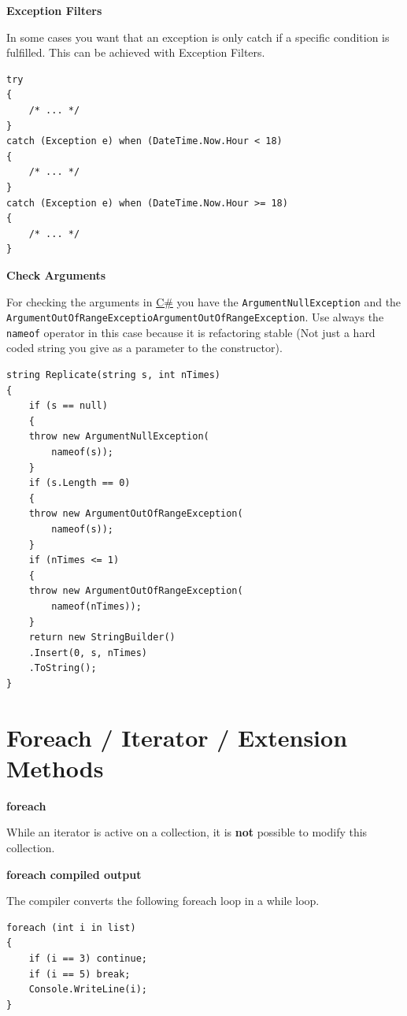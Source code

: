 \documentclass[11pt,twoside,landscape]{article}
\begin{document}
\begin{multicols}{3}
\textbf{Exception Filters}

In some cases you want that an exception is only catch if a specific condition is fulfilled.
This can be achieved with Exception Filters.

\lstset{language=csharp,label= ,caption= ,captionpos=b,numbers=none}
\begin{lstlisting}
try
{
    /* ... */
}
catch (Exception e) when (DateTime.Now.Hour < 18)
{
    /* ... */
}
catch (Exception e) when (DateTime.Now.Hour >= 18)
{
    /* ... */
}
\end{lstlisting}

\textbf{Check Arguments}

For checking the arguments in \href{../../../roam/20211003114158-c.org}{C\#} you have the \texttt{ArgumentNullException} and the \texttt{ArgumentOutOfRangeExceptioArgumentOutOfRangeException}.
Use always the \texttt{nameof} operator in this case because it is refactoring stable (Not just a hard coded string you give as a parameter to the constructor).

\lstset{language=csharp,label= ,caption= ,captionpos=b,numbers=none}
\begin{lstlisting}
string Replicate(string s, int nTimes)
{
    if (s == null)
    {
	throw new ArgumentNullException(
	    nameof(s));
    }
    if (s.Length == 0)
    {
	throw new ArgumentOutOfRangeException(
	    nameof(s));
    }
    if (nTimes <= 1)
    {
	throw new ArgumentOutOfRangeException(
	    nameof(nTimes));
    }
    return new StringBuilder()
	.Insert(0, s, nTimes)
	.ToString();
}
\end{lstlisting}

\section{Foreach / Iterator / Extension Methods}
\label{sec:orgf2ab320}

\textbf{foreach}

While an iterator is active on a collection, it is \textbf{not} possible to modify this collection.

\textbf{foreach compiled output}

The compiler converts the following foreach loop in a while loop.

\lstset{language=csharp,label= ,caption= ,captionpos=b,numbers=none}
\begin{lstlisting}
foreach (int i in list)
{
    if (i == 3) continue;
    if (i == 5) break;
    Console.WriteLine(i);
}
\end{lstlisting}


\end{multicols}
\end{document}
